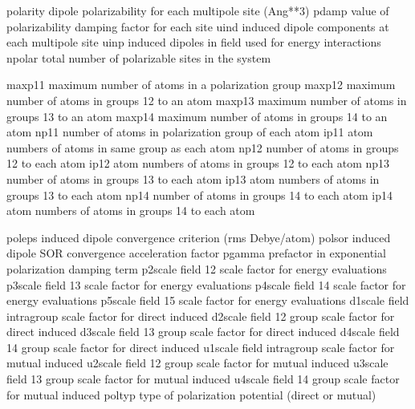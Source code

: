 \documentclass[letterpaper,11pt,english]{sphinxmanual}
\begin{document}
\begin{sphinxVerbatim}[commandchars=\\\{\}]
polarity        dipole polarizability for each multipole site (Ang**3)
pdamp           value of polarizability damping factor for each site
uind            induced dipole components at each multipole site
uinp            induced dipoles in field used for energy interactions
npolar          total number of polarizable sites in the system
\end{sphinxVerbatim}


\begin{sphinxVerbatim}[commandchars=\\\{\}]
maxp11          maximum number of atoms in a polarization group
maxp12          maximum number of atoms in groups 1\PYGZhy{}2 to an atom
maxp13          maximum number of atoms in groups 1\PYGZhy{}3 to an atom
maxp14          maximum number of atoms in groups 1\PYGZhy{}4 to an atom
np11            number of atoms in polarization group of each atom
ip11            atom numbers of atoms in same group as each atom
np12            number of atoms in groups 1\PYGZhy{}2 to each atom
ip12            atom numbers of atoms in groups 1\PYGZhy{}2 to each atom
np13            number of atoms in groups 1\PYGZhy{}3 to each atom
ip13            atom numbers of atoms in groups 1\PYGZhy{}3 to each atom
np14            number of atoms in groups 1\PYGZhy{}4 to each atom
ip14            atom numbers of atoms in groups 1\PYGZhy{}4 to each atom
\end{sphinxVerbatim}


\begin{sphinxVerbatim}[commandchars=\\\{\}]
poleps          induced dipole convergence criterion (rms Debye/atom)
polsor          induced dipole SOR convergence acceleration factor
pgamma          prefactor in exponential polarization damping term
p2scale         field 1\PYGZhy{}2 scale factor for energy evaluations
p3scale         field 1\PYGZhy{}3 scale factor for energy evaluations
p4scale         field 1\PYGZhy{}4 scale factor for energy evaluations
p5scale         field 1\PYGZhy{}5 scale factor for energy evaluations
d1scale         field intra\PYGZhy{}group scale factor for direct induced
d2scale         field 1\PYGZhy{}2 group scale factor for direct induced
d3scale         field 1\PYGZhy{}3 group scale factor for direct induced
d4scale         field 1\PYGZhy{}4 group scale factor for direct induced
u1scale         field intra\PYGZhy{}group scale factor for mutual induced
u2scale         field 1\PYGZhy{}2 group scale factor for mutual induced
u3scale         field 1\PYGZhy{}3 group scale factor for mutual induced
u4scale         field 1\PYGZhy{}4 group scale factor for mutual induced
poltyp          type of polarization potential (direct or mutual)
\end{sphinxVerbatim}
\end{document}
